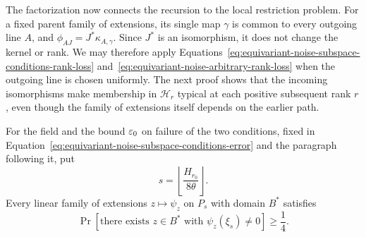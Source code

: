 The factorization now connects the recursion to the local restriction
problem.  For a fixed parent family of extensions, its single map $\gamma$ is common to
every outgoing line $A$, and
$\phi_{AJ}=J^*\kappa_{A,\gamma}$.  Since $J^*$ is an isomorphism, it does
not change the kernel or rank.  We may therefore apply
Equations~\eqref{eq:equivariant-noise-subspace-conditions-rank-loss}
and~\eqref{eq:equivariant-noise-arbitrary-rank-loss} when the outgoing line is chosen
uniformly.  The next proof shows that the incoming isomorphisms make
membership in $\mathcal H_r$ typical at each positive subsequent rank $r$, even though the family of extensions
itself depends on the earlier path.

\begin{proposition}\label{prop:equivariant-noise-all-extensions-detection}
For the field and the bound $\varepsilon_0$ on failure of the two conditions, fixed in
Equation~\eqref{eq:equivariant-noise-subspace-conditions-error} and the paragraph following it, put
\begin{equation}\label{eq:equivariant-noise-depth}
 s=\left\lfloor\frac{H_{r_0}}{8\theta}\right\rfloor.
\end{equation}
Every linear family of extensions $z\mapsto\psi_z$ on $P_s$ with domain $B^*$ satisfies
\begin{equation}\label{eq:equivariant-noise-all-extensions-detection}
 \Pr[\text{there exists }z\in B^*\text{ with }\psi_z(\xi_s)\ne0]
 \ge\frac14.
\end{equation}
\end{proposition}

